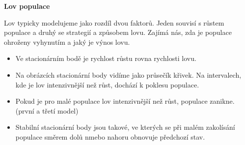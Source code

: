 \documentclass{article}
\begin{document}
\begin{center}
  \Large \bfseries
Lov populace
\end{center}
\pagestyle{empty}

Lov typicky modelujeme jako rozdíl dvou faktorů. Jeden souvisí s růstem populace a druhý se strategií a způsobem lovu. Zajímá nás, zda je populace ohroženy vyhynutím a jaký je výnos lovu.

\begin{itemize}\itemsep=0pt
\item Ve stacionárním bodě je rychlost růstu rovna rychlosti lovu. 
\item Na obrázcích stacionární body vidíme jako průsečík křivek. Na intervalech, kde je
  lov intenzivnější než růst, dochází k poklesu populace.
\item Pokud je pro malé populace lov intenzivnější než růst, populace zanikne.  (první a třetí model)
\item Stabilní stacionární body jsou takové, ve kterých se při malém zakolísání populace směrem dolů nmebo nahoru obnovuje předchozí stav. 
\end{itemize}
\everymath{\displaystyle} 
\end{document}
